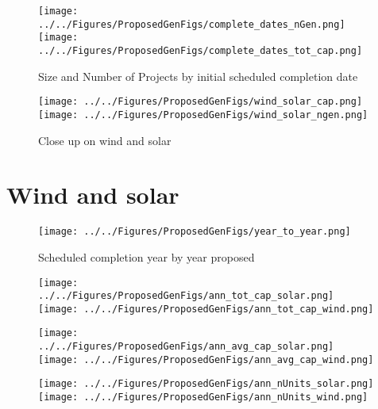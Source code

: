 \documentclass[11pt, oneside]{article}   	%
\begin{document}
\begin{figure}[!hb]
\caption{Size and Number of Projects by initial scheduled completion date}
\texttt{[image: ../../Figures/ProposedGenFigs/complete\_dates\_nGen.png]}
\texttt{[image: ../../Figures/ProposedGenFigs/complete\_dates\_tot\_cap.png]}
\end{figure}

\begin{figure}[!hb]
\caption{Close up on wind and solar} 
\texttt{[image: ../../Figures/ProposedGenFigs/wind\_solar\_cap.png]}
\texttt{[image: ../../Figures/ProposedGenFigs/wind\_solar\_ngen.png]}
\end{figure}

\vfill
\clearpage

\section{Wind and solar} 
\begin{figure}[!hb]
\caption{Scheduled completion year by year proposed}
\texttt{[image: ../../Figures/ProposedGenFigs/year\_to\_year.png]}
\end{figure}









\begin{figure}[ht]
\texttt{[image: ../../Figures/ProposedGenFigs/ann\_tot\_cap\_solar.png]}
\texttt{[image: ../../Figures/ProposedGenFigs/ann\_tot\_cap\_wind.png]}
\end{figure}

\begin{figure}[ht]
\texttt{[image: ../../Figures/ProposedGenFigs/ann\_avg\_cap\_solar.png]}
\texttt{[image: ../../Figures/ProposedGenFigs/ann\_avg\_cap\_wind.png]}
\end{figure}

\begin{figure}[ht]
\texttt{[image: ../../Figures/ProposedGenFigs/ann\_nUnits\_solar.png]}
\texttt{[image: ../../Figures/ProposedGenFigs/ann\_nUnits\_wind.png]}
\end{figure}
\end{document}
